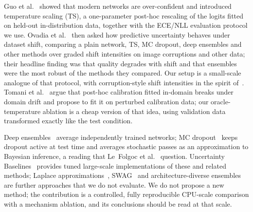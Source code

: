 Guo et al.~\cite{guo2017calibration} showed that modern networks are over-confident and introduced temperature scaling (TS), a one-parameter post-hoc rescaling of the logits fitted on held-out in-distribution data, together with the ECE/NLL evaluation protocol we use. Ovadia et al.~\cite{ovadia2019can} then asked how predictive uncertainty behaves under dataset shift, comparing a plain network, TS, MC dropout, deep ensembles and other methods over graded shift intensities on image corruptions and other data; their headline finding was that quality degrades with shift and that ensembles were the most robust of the methods they compared. Our setup is a small-scale analogue of that protocol, with corruption-style shift intensities in the spirit of~\cite{hendrycks2019benchmarking}. Tomani et al.~\cite{tomani2020post} argue that post-hoc calibration fitted in-domain breaks under domain drift and propose to fit it on perturbed calibration data; our oracle-temperature ablation is a cheap version of that idea, using validation data transformed exactly like the test condition.

Deep ensembles~\cite{lakshminarayanan2016simple} average independently trained networks; MC dropout~\cite{gal2015dropout} keeps dropout active at test time and averages stochastic passes as an approximation to Bayesian inference, a reading that Le~Folgoc et al.~\cite{folgoc2021is} question. Uncertainty Baselines~\cite{nado2021uncertainty} provides tuned large-scale implementations of these and related methods; Laplace approximations~\cite{daxberger2021laplace}, SWAG~\cite{maddox2019simple} and architecture-diverse ensembles~\cite{zaidi2020neural} are further approaches that we do not evaluate. We do not propose a new method; the contribution is a controlled, fully reproducible CPU-scale comparison with a mechanism ablation, and its conclusions should be read at that scale.
